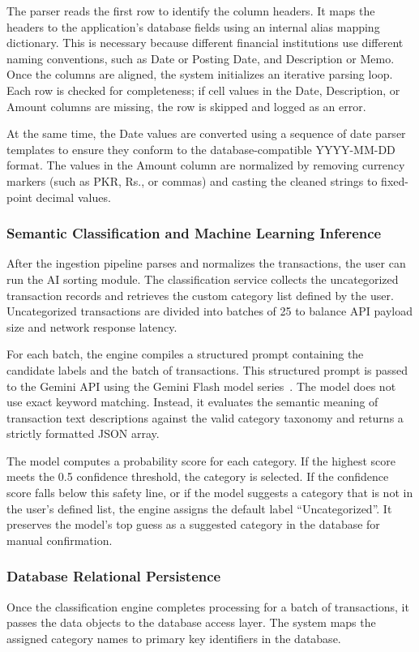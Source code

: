 The parser reads the first row to identify the column headers. It maps the headers to the application's database fields using an internal alias mapping dictionary. This is necessary because different financial institutions use different naming conventions, such as Date or Posting Date, and Description or Memo. Once the columns are aligned, the system initializes an iterative parsing loop. Each row is checked for completeness; if cell values in the Date, Description, or Amount columns are missing, the row is skipped and logged as an error.

At the same time, the Date values are converted using a sequence of date parser templates to ensure they conform to the database-compatible YYYY-MM-DD format. The values in the Amount column are normalized by removing currency markers (such as PKR, Rs., or commas) and casting the cleaned strings to fixed-point decimal values.

\subsubsection{Semantic Classification and Machine Learning Inference}
After the ingestion pipeline parses and normalizes the transactions, the user can run the AI sorting module. The classification service collects the uncategorized transaction records and retrieves the custom category list defined by the user. Uncategorized transactions are divided into batches of 25 to balance API payload size and network response latency.

For each batch, the engine compiles a structured prompt containing the candidate labels and the batch of transactions. This structured prompt is passed to the Gemini API using the Gemini Flash model series~\cite{google2023gemini}. The model does not use exact keyword matching. Instead, it evaluates the semantic meaning of transaction text descriptions against the valid category taxonomy and returns a strictly formatted JSON array.

The model computes a probability score for each category. If the highest score meets the 0.5 confidence threshold, the category is selected. If the confidence score falls below this safety line, or if the model suggests a category that is not in the user's defined list, the engine assigns the default label ``Uncategorized''. It preserves the model's top guess as a suggested category in the database for manual confirmation.

\subsubsection{Database Relational Persistence}
Once the classification engine completes processing for a batch of transactions, it passes the data objects to the database access layer. The system maps the assigned category names to primary key identifiers in the database.

